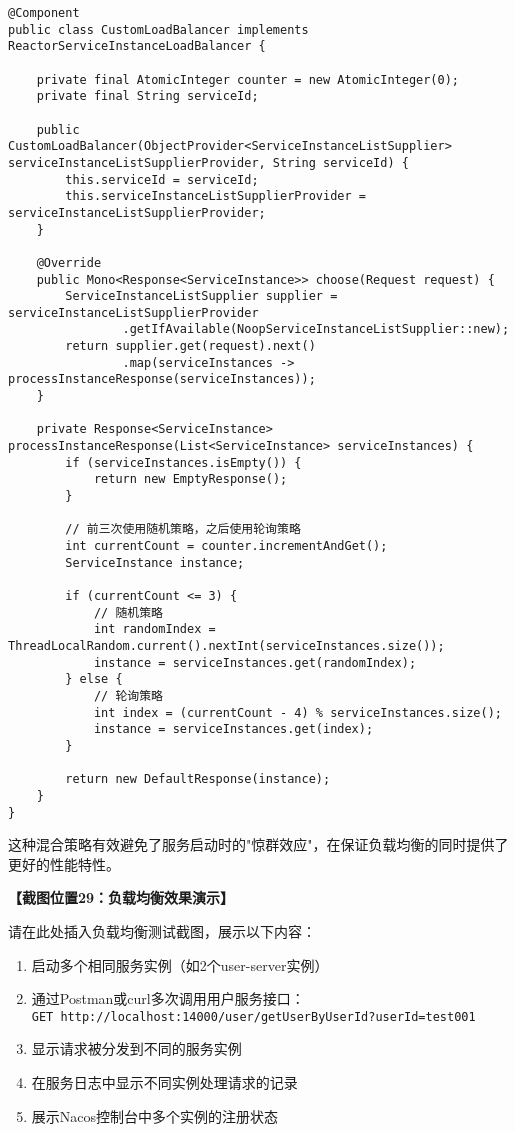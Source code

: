 \documentclass[a4paper,12pt]{article}
\begin{document}
\begin{lstlisting}[caption=自定义负载均衡策略]
@Component
public class CustomLoadBalancer implements ReactorServiceInstanceLoadBalancer {
    
    private final AtomicInteger counter = new AtomicInteger(0);
    private final String serviceId;
    
    public CustomLoadBalancer(ObjectProvider<ServiceInstanceListSupplier> serviceInstanceListSupplierProvider, String serviceId) {
        this.serviceId = serviceId;
        this.serviceInstanceListSupplierProvider = serviceInstanceListSupplierProvider;
    }
    
    @Override
    public Mono<Response<ServiceInstance>> choose(Request request) {
        ServiceInstanceListSupplier supplier = serviceInstanceListSupplierProvider
                .getIfAvailable(NoopServiceInstanceListSupplier::new);
        return supplier.get(request).next()
                .map(serviceInstances -> processInstanceResponse(serviceInstances));
    }
    
    private Response<ServiceInstance> processInstanceResponse(List<ServiceInstance> serviceInstances) {
        if (serviceInstances.isEmpty()) {
            return new EmptyResponse();
        }
        
        // 前三次使用随机策略，之后使用轮询策略
        int currentCount = counter.incrementAndGet();
        ServiceInstance instance;
        
        if (currentCount <= 3) {
            // 随机策略
            int randomIndex = ThreadLocalRandom.current().nextInt(serviceInstances.size());
            instance = serviceInstances.get(randomIndex);
        } else {
            // 轮询策略
            int index = (currentCount - 4) % serviceInstances.size();
            instance = serviceInstances.get(index);
        }
        
        return new DefaultResponse(instance);
    }
}
\end{lstlisting}

这种混合策略有效避免了服务启动时的"惊群效应"，在保证负载均衡的同时提供了更好的性能特性。

\textbf{【截图位置29：负载均衡效果演示】}

请在此处插入负载均衡测试截图，展示以下内容：
\begin{enumerate}
\item 启动多个相同服务实例（如2个user-server实例）
\item 通过Postman或curl多次调用用户服务接口：\\
  \texttt{GET http://localhost:14000/user/getUserByUserId?userId=test001}
\item 显示请求被分发到不同的服务实例
\item 在服务日志中显示不同实例处理请求的记录
\item 展示Nacos控制台中多个实例的注册状态
\end{enumerate}
\end{document}
